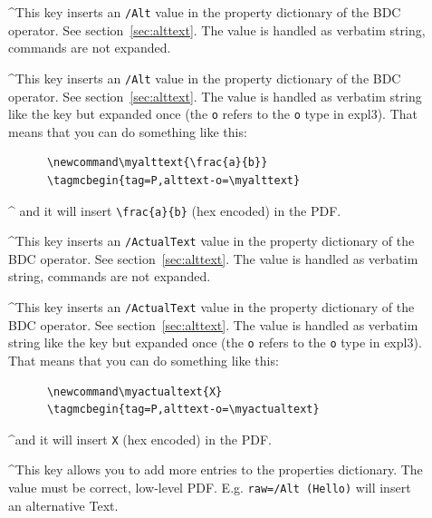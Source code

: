 \documentclass[DIV=12,parskip=half-,bibliography=totoc]{scrartcl}
\newcommand\PDF{PDF}
\begin{document}
\begin{description}
  \item[]
   \TagP^This key inserts an \texttt{/Alt} value in the property dictionary of the BDC operator. See section~\ref{sec:alttext}. The value is handled as verbatim string, commands are not expanded.\Pmeti
  \item[]
  \TagP^This key inserts an \texttt{/Alt} value in the property dictionary of the BDC operator. See section~\ref{sec:alttext}. The value is handled as verbatim string like the key  but expanded once (the \texttt{o} refers to the \texttt{o} type in expl3).
  That means that you can do something like this: \TagPend
  
      \begin{lstlisting}
      \newcommand\myalttext{\frac{a}{b}}
      \tagmcbegin{tag=P,alttext-o=\myalttext}
      \end{lstlisting}
  

  \TagP^    and it will insert \verb+\frac{a}{b}+  (hex encoded) in the \PDF{}.\Pmeti

  \item[]
  \TagP^This key inserts an \texttt{/ActualText} value in the property dictionary of the BDC operator. See section~\ref{sec:alttext}. The value is handled as verbatim string, commands are not expanded.\Pmeti


  \item[]
  \TagP^This key inserts an \texttt{/ActualText} value in the property dictionary of the BDC operator. See section~\ref{sec:alttext}. The value is handled as verbatim string like the key  but expanded once (the \texttt{o} refers to the \texttt{o} type in expl3). That means that you can do something like this:\TagPend


      \begin{lstlisting}
      \newcommand\myactualtext{X}
      \tagmcbegin{tag=P,alttext-o=\myactualtext}
      \end{lstlisting}
 


 \TagP^and it will insert \verb+X+ (hex encoded)  in the \PDF{}.\Pmeti

  \item[]
  \TagP^This key allows you to add more entries to the properties dictionary. The value must be correct, low-level \PDF{}. E.g. \verb+raw=/Alt (Hello)+ will insert an alternative Text.\Pmeti
\end{description}
\end{document}
